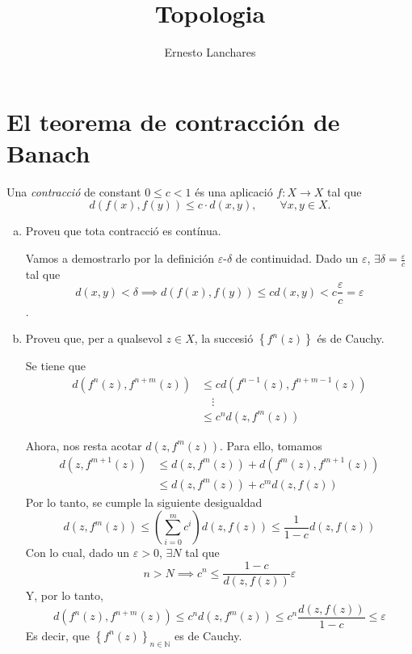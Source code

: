 \documentclass[12pt]{article}
\newcommand{\n}{\mathbb{N}}
\newcommand\setb[1]{\left\{#1\right\}}
\theoremstyle{break}
\begin{document}
\date{}

\title{Topologia}
\author{Ernesto Lanchares}
\maketitle

\section{El teorema de contracción de Banach}

Una \emph{contracció} de constant $0 \leq c < 1$ és una aplicació $f \colon X \to X$ tal que
\[
	d\left( f(x), f(y) \right) \leq c \cdot d(x, y), \qquad \forall x, y \in X.
\]
\begin{enumerate}[a)]
\item\label{item:con} Proveu que tota contracció es contínua.

	Vamos a demostrarlo por la definición $\varepsilon$-$\delta$ de continuidad.
	Dado un $\varepsilon$, $\exists \delta = \frac{\varepsilon}{c}$ tal que
	\[
		d(x, y) < \delta \implies d\left( f(x), f(y) \right) \leq c d(x,y) < c\frac{\varepsilon}{c} = \varepsilon
	\].
\item\label{item:otra} Proveu que, per a qualsevol $z \in X$, la succesió $\setb{f^n(z)}$ és de Cauchy.

	Se tiene que
	\[
		\begin{aligned}
			d\left( f^n(z), f^{n+m}(z) \right) &\leq cd\left( f^{n-1}(z), f^{n+m-1}(z) \right) \\
			& \quad \vdots \\
			&\leq c^n d\left(z, f^m(z) \right)
		\end{aligned}
	\]

	Ahora, nos resta acotar $d\left( z, f^m(z) \right)$. Para ello, tomamos
	\[
		\begin{aligned}
			d\left( z, f^{m+1}(z) \right) &\leq d\left( z, f^m(z) \right) + d\left( f^m(z), f^{m+1}(z) \right) \\
			&\leq d\left( z, f^m(z) \right) + c^m d\left( z, f(z) \right)
		\end{aligned}
	\]
	Por lo tanto, se cumple la siguiente desigualdad
	\[
		d\left( z, f^m(z) \right) \leq \left( \sum^m_{i = 0} c^i \right) d\left( z, f(z) \right) \leq
		\frac{1}{1-c} d\left( z, f(z) \right)
	\]
	Con lo cual, dado un $\varepsilon > 0$, $\exists N$ tal que
	\[
		n > N \implies c^n \leq \frac{1-c}{d\left( z, f(z) \right)}\varepsilon
	\]
	Y, por lo tanto,
	\[
		d\left( f^n(z), f^{n+m}(z) \right) \leq c^nd\left( z, f^m(z) \right)
		\leq c^n \frac{d\left( z, f(z) \right)}{1 - c} \leq \varepsilon
	\]
	Es decir, que $\setb{f^n(z)}_{n \in \n}$ es de Cauchy.


\end{enumerate}
\end{document}

